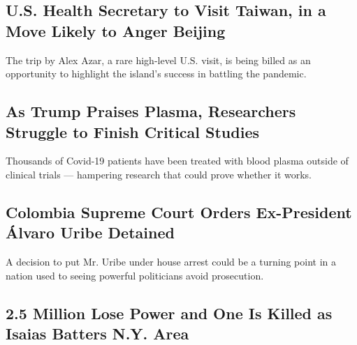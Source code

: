 \href{/2020/08/04/world/asia/taiwan-azar-beijing-coronavirus.html}{}

\hypertarget{us-health-secretary-to-visit-taiwan-in-a-move-likely-to-anger-beijing}{%
\subsection{U.S. Health Secretary to Visit Taiwan, in a Move Likely to
Anger
Beijing}\label{us-health-secretary-to-visit-taiwan-in-a-move-likely-to-anger-beijing}}

The trip by Alex Azar, a rare high-level U.S. visit, is being billed as
an opportunity to highlight the island's success in battling the
pandemic.

\href{/2020/08/04/health/trump-plasma.html}{}

\hypertarget{as-trump-praises-plasma-researchers-struggle-to-finish-critical-studies}{%
\subsection{As Trump Praises Plasma, Researchers Struggle to Finish
Critical
Studies}\label{as-trump-praises-plasma-researchers-struggle-to-finish-critical-studies}}

Thousands of Covid-19 patients have been treated with blood plasma
outside of clinical trials --- hampering research that could prove
whether it works.

\href{/2020/08/04/world/americas/colombia-president-uribe-charged.html}{}

\hypertarget{colombia-supreme-court-orders-ex-president-uxe1lvaro-uribe-detained}{%
\subsection{Colombia Supreme Court Orders Ex-President Álvaro Uribe
Detained}\label{colombia-supreme-court-orders-ex-president-uxe1lvaro-uribe-detained}}

\href{/2020/08/04/world/americas/colombia-president-uribe-charged.html}{}

A decision to put Mr. Uribe under house arrest could be a turning point
in a nation used to seeing powerful politicians avoid prosecution.

\href{/2020/08/04/nyregion/isaias-ny.html}{}

\hypertarget{25-million-lose-power-and-one-is-killed-as-isaias-batters-ny-area}{%
\subsection{2.5 Million Lose Power and One Is Killed as Isaias Batters
N.Y.
Area}\label{25-million-lose-power-and-one-is-killed-as-isaias-batters-ny-area}}

